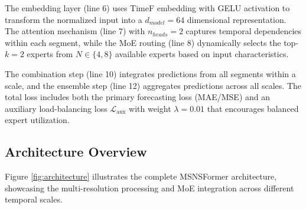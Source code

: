 \documentclass{article}
\begin{document}
The embedding layer (line 6) uses TimeF embedding with GELU activation to transform the normalized input into a $d_{model}=64$ dimensional representation. The attention mechanism (line 7) with $n_{heads}=2$ captures temporal dependencies within each segment, while the MoE routing (line 8) dynamically selects the top-$k=2$ experts from $N \in \{4,8\}$ available experts based on input characteristics.

The combination step (line 10) integrates predictions from all segments within a scale, and the ensemble step (line 12) aggregates predictions across all scales. The total loss includes both the primary forecasting loss (MAE/MSE) and an auxiliary load-balancing loss $\mathcal{L}_{\text{aux}}$ with weight $\lambda=0.01$ that encourages balanced expert utilization.

\subsection{Architecture Overview}
Figure \ref{fig:architecture} illustrates the complete MSNSFormer architecture, showcasing the multi-resolution processing and MoE integration across different temporal scales.
\end{document}
